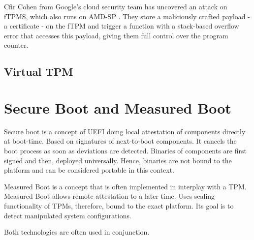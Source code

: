 Cfir Cohen from Google's cloud security team has uncovered an attack on fTPMS, which also runs on AMD-SP \cite{cohen}. They store a maliciously crafted payload - a certificate - on the fTPM and trigger a function with a stack-based overflow error that accesses this payload, giving them full control over the program counter.



\subsection{Virtual TPM}




\section{Secure Boot and Measured Boot}

Secure boot is a concept of UEFI doing local attestation of components directly at boot-time. Based on signatures of next-to-boot components. It cancels the boot process as soon as deviations are detected. Binaries of components are first signed and then, deployed universally. Hence, binaries are not bound to the platform and can be considered portable in this context.

Measured Boot is a concept that is often implemented in interplay with a TPM. Measured Boot allows remote attestation to a later time. Uses sealing functionality of TPMs, therefore, bound to the exact platform. Its goal is to detect manipulated system configurations.

Both technologies are often used in conjunction.
